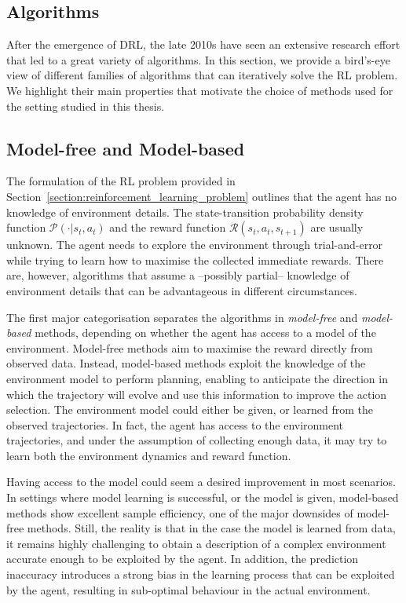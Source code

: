 \begin{addmargin}{0cm}

\section{Algorithms}

After the emergence of \acl{DRL}, the late 2010s have seen an extensive research effort that led to a great variety of algorithms.
In this section, we provide a bird's-eye view of different families of algorithms that can iteratively solve the \ac{RL} problem.
We highlight their main properties that motivate the choice of methods used for the setting studied in this thesis.

\vspace*{-3mm}
\subsection{Model-free and Model-based}

The formulation of the \ac{RL} problem provided in Section~\ref{section:reinforcement_learning_problem} outlines that the agent has no knowledge of environment details.
The state-transition probability density function $\mathcal{P}(\cdot|s_t, a_t)$ and the reward function $\mathcal{R}(s_t, a_t, s_{t+1})$ are usually unknown.
The agent needs to explore the environment through trial-and-error while trying to learn how to maximise the collected immediate rewards.
There are, however, algorithms that assume a --possibly partial-- knowledge of environment details that can be advantageous in different circumstances.

The first major categorisation separates the algorithms in \emph{model-free} and \emph{model-based} methods, depending on whether the agent has access to a model of the environment.
Model-free methods aim to maximise the reward directly from observed data.
Instead, model-based methods exploit the knowledge of the environment model to perform planning, enabling to anticipate the direction in which the trajectory will evolve and use this information to improve the action selection.
The environment model could either be given, or learned from the observed trajectories.
In fact, the agent has access to the environment trajectories, and under the assumption of collecting enough data, it may try to learn both the environment dynamics and reward function.

Having access to the model could seem a desired improvement in most scenarios.
In settings where model learning is successful, or the model is given, model-based methods show excellent sample efficiency, one of the major downsides of model-free methods.
Still, the reality is that in the case the model is learned from data, it remains highly challenging to obtain a description of a complex environment accurate enough to be exploited by the agent.
In addition, the prediction inaccuracy introduces a strong bias in the learning process that can be exploited by the agent, resulting in sub-optimal behaviour in the actual environment.

\end{addmargin}


